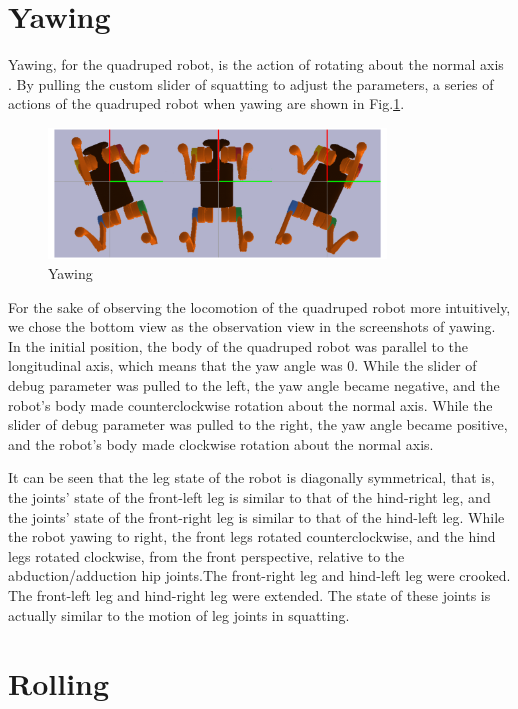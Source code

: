 \section{Yawing}

Yawing, for the quadruped robot, is the action of rotating about the normal axis \cite{ref:6DOF}. By pulling the custom slider of squatting to adjust the parameters, a series of actions of the quadruped robot when yawing are shown in Fig.\ref{fig: yawing}.

\begin{figure}[htbp]
    \centering
    \includegraphics[width=0.8\textwidth]{figures/yawing.png}
    \caption{Yawing}
    \label{fig: yawing}
\end{figure}


For the sake of observing the locomotion of the quadruped robot more intuitively, we chose the bottom view as the observation view in the screenshots of yawing. In the initial position, the body of the quadruped robot was parallel to the longitudinal axis, which means that the yaw angle was 0. While the slider of debug parameter was pulled to the left, the yaw angle became negative, and the robot's body made counterclockwise rotation about the normal axis. While the slider of debug parameter was pulled to the right, the yaw angle became positive, and the robot's body made clockwise rotation about the normal axis.

It can be seen that the leg state of the robot is diagonally symmetrical, that is, the joints' state of the front-left leg is similar to that of the hind-right leg, and the joints' state of the front-right leg is similar to that of the hind-left leg. While the robot yawing to right, the front legs rotated counterclockwise, and the hind legs rotated clockwise, from the front perspective, relative to the abduction/adduction hip joints.The front-right leg and hind-left leg were crooked. The front-left leg and hind-right leg were extended. The state of these joints is actually similar to the motion of leg joints in squatting.


\section{Rolling}

